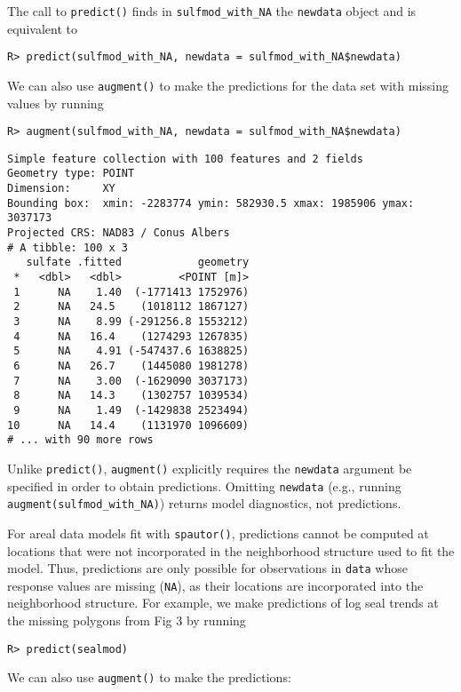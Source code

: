 \documentclass[10pt,letterpaper]{article}
\begin{document}
The call to \texttt{predict()} finds in \texttt{sulfmod\_with\_NA} the
\texttt{newdata} object and is equivalent to

\begin{verbatim}
R> predict(sulfmod_with_NA, newdata = sulfmod_with_NA$newdata)
\end{verbatim}

We can also use \texttt{augment()} to make the predictions for the data
set with missing values by running

\begin{verbatim}
R> augment(sulfmod_with_NA, newdata = sulfmod_with_NA$newdata)
\end{verbatim}

\begin{verbatim}
Simple feature collection with 100 features and 2 fields
Geometry type: POINT
Dimension:     XY
Bounding box:  xmin: -2283774 ymin: 582930.5 xmax: 1985906 ymax: 3037173
Projected CRS: NAD83 / Conus Albers
# A tibble: 100 x 3
   sulfate .fitted            geometry
 *   <dbl>   <dbl>         <POINT [m]>
 1      NA    1.40  (-1771413 1752976)
 2      NA   24.5    (1018112 1867127)
 3      NA    8.99 (-291256.8 1553212)
 4      NA   16.4    (1274293 1267835)
 5      NA    4.91 (-547437.6 1638825)
 6      NA   26.7    (1445080 1981278)
 7      NA    3.00  (-1629090 3037173)
 8      NA   14.3    (1302757 1039534)
 9      NA    1.49  (-1429838 2523494)
10      NA   14.4    (1131970 1096609)
# ... with 90 more rows
\end{verbatim}

Unlike \texttt{predict()}, \texttt{augment()} explicitly requires the
\texttt{newdata} argument be specified in order to obtain predictions.
Omitting \texttt{newdata} (e.g., running
\texttt{augment(sulfmod\_with\_NA)}) returns model diagnostics, not
predictions.

For areal data models fit with \texttt{spautor()}, predictions cannot be
computed at locations that were not incorporated in the neighborhood
structure used to fit the model. Thus, predictions are only possible for
observations in \texttt{data} whose response values are missing
(\texttt{NA}), as their locations are incorporated into the neighborhood
structure. For example, we make predictions of log seal trends at the
missing polygons from Fig 3 by running

\begin{verbatim}
R> predict(sealmod)
\end{verbatim}

We can also use \texttt{augment()} to make the predictions:
\end{document}
